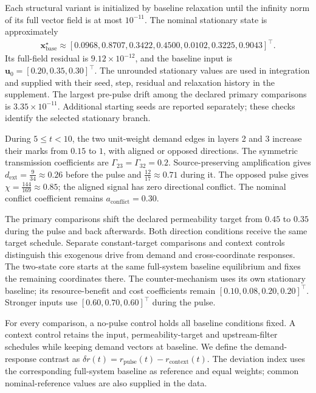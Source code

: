 
Each structural variant is initialized by baseline relaxation until the infinity norm of its full vector field is at most $10^{-11}$. The nominal stationary state is approximately \begin{gather*}\bm x^\star_{\mathrm{base}}\approx [0.0968,0.8707,0.3422,0.4500,0.0102,0.3225,0.9043]^{\top}.\end{gather*} Its full-field residual is $9.12\times10^{-12}$, and the baseline input is $\bm u_0=[0.20,0.35,0.30]^{\top}$. The unrounded stationary values are used in integration and supplied with their seed, step, residual and relaxation history in the supplement. The largest pre-pulse drift among the declared primary comparisons is $3.35\times10^{-11}$. Additional starting seeds are reported separately; these checks identify the selected stationary branch.

During $5\leq t<10$, the two unit-weight demand edges in layers 2 and 3 increase their marks from $0.15$ to $1$, with aligned or opposed directions. The symmetric transmission coefficients are $\Gamma_{23}=\Gamma_{32}=0.2$. Source-preserving amplification gives $d_{\mathrm{ext}}=\frac{9}{34}\approx 0.26$ before the pulse and $\frac{12}{17}\approx 0.71$ during it. The opposed pulse gives $\chi=\frac{144}{169}\approx 0.85$; the aligned signal has zero directional conflict. The nominal conflict coefficient remains $a_{\mathrm{conflict}}=0.30$.

The primary comparisons shift the declared permeability target from $0.45$ to $0.35$ during the pulse and back afterwards. Both direction conditions receive the same target schedule. Separate constant-target comparisons and context controls distinguish this exogenous drive from demand and cross-coordinate responses. The two-state core starts at the same full-system baseline equilibrium and fixes the remaining coordinates there. The counter-mechanism uses its own stationary baseline; its resource-benefit and cost coefficients remain $[0.10,0.08,0.20,0.20]^{\top}$. Stronger inputs use $[0.60,0.70,0.60]^{\top}$ during the pulse.

For every comparison, a no-pulse control holds all baseline conditions fixed. A context control retains the input, permeability-target and upstream-filter schedules while keeping demand vectors at baseline. We define the demand-response contrast as $\delta r(t)=r_{\mathrm{pulse}}(t)-r_{\mathrm{context}}(t)$. The deviation index uses the corresponding full-system baseline as reference and equal weights; common nominal-reference values are also supplied in the data.

